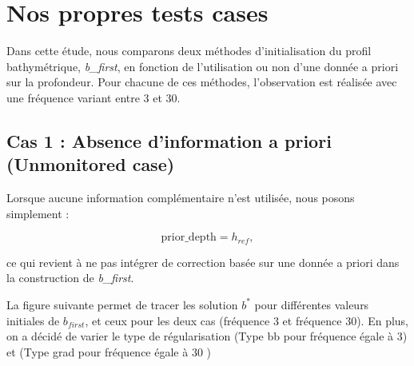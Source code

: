 \documentclass{article}
\begin{document}
\section{Nos propres tests cases}

Dans cette étude, nous comparons deux méthodes d'initialisation du profil bathymétrique, \emph{b\_first}, en fonction de l'utilisation ou non d'une donnée a priori sur la profondeur. Pour chacune de ces méthodes, l'observation est réalisée avec une fréquence variant entre 3 et 30.



\subsection{Cas 1 : Absence d'information a priori (Unmonitored case)}

Lorsque aucune information complémentaire n'est utilisée, nous posons simplement :


\[
\text{prior\_depth} = h_{ref},
\]


ce qui revient à ne pas intégrer de correction basée sur une donnée a priori dans la construction de \emph{b\_first}. \newline 


La figure suivante permet de tracer les solution $b^*$ pour différentes valeurs initiales de $b_{first}$, et ceux pour les deux cas (fréquence 3 et fréquence 30). En plus, on a décidé de varier le type de régularisation (Type bb pour fréquence égale à 3) et (Type grad pour fréquence égale à $30$
)
\end{document}
